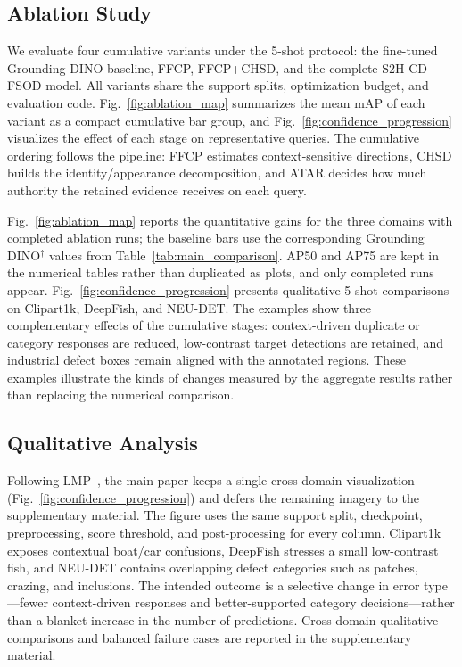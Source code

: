 \subsection{Ablation Study}
\label{sec:ablation}




We evaluate four cumulative variants under the 5-shot protocol: the fine-tuned
Grounding DINO baseline, FFCP, FFCP+CHSD, and the complete S2H-CD-FSOD model.
All variants share the support splits, optimization budget, and evaluation
code. Fig.~\ref{fig:ablation_map} summarizes the mean mAP of each variant as a
compact cumulative bar group, and Fig.~\ref{fig:confidence_progression}
visualizes the effect of each stage on representative queries. The cumulative
ordering follows the pipeline: FFCP estimates context-sensitive directions,
CHSD builds the identity/appearance decomposition, and ATAR decides how much
authority the retained evidence receives on each query.

Fig.~\ref{fig:ablation_map} reports the quantitative gains for the three
domains with completed ablation runs; the baseline bars use the corresponding
Grounding DINO$^\dagger$ values from Table~\ref{tab:main_comparison}.
AP50 and AP75 are kept in the numerical tables rather than duplicated as plots,
and only completed runs appear. Fig.~\ref{fig:confidence_progression} presents
qualitative 5-shot comparisons on Clipart1k, DeepFish, and NEU-DET. The
examples show three complementary effects of the cumulative stages:
context-driven duplicate or category responses are reduced, low-contrast target
detections are retained, and industrial defect boxes remain aligned with the
annotated regions. These examples illustrate the kinds of changes measured by
the aggregate results rather than replacing the numerical comparison.

\subsection{Qualitative Analysis}
\label{sec:qualitative}

Following LMP~\cite{lmp}, the main paper keeps a single cross-domain
visualization (Fig.~\ref{fig:confidence_progression}) and defers the remaining
imagery to the supplementary material. The figure uses the same support split,
checkpoint, preprocessing, score threshold, and post-processing for every
column. Clipart1k exposes contextual boat/car confusions, DeepFish stresses a
small low-contrast fish, and NEU-DET contains overlapping defect categories
such as patches, crazing, and inclusions. The intended outcome is a selective
change in error type---fewer context-driven responses and better-supported
category decisions---rather than a blanket increase in the number of
predictions. Cross-domain qualitative comparisons and balanced failure cases
are reported in the supplementary material.
